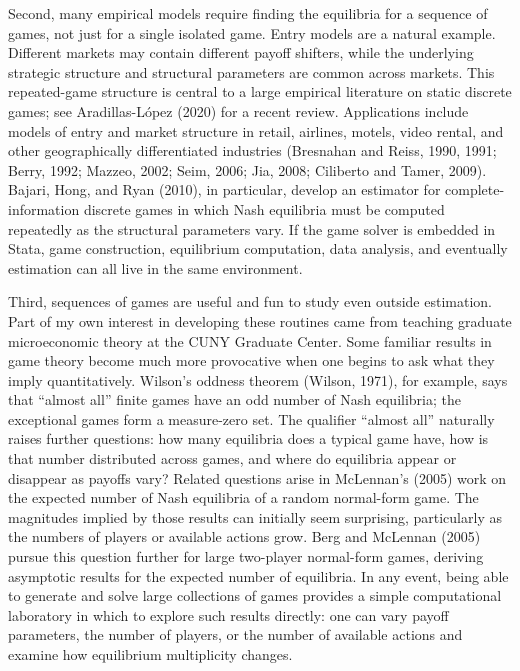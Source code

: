 \documentclass[11pt]{article}
\begin{document}
Second, many empirical models require finding the equilibria for a
sequence of games, not just for a single isolated game. Entry models are
a natural example. Different markets may contain different payoff
shifters, while the underlying strategic structure and structural
parameters are common across markets. This repeated-game structure is
central to a large empirical literature on static discrete games; see
Aradillas-López (2020) for a recent review. Applications include models
of entry and market structure in retail, airlines, motels, video rental,
and other geographically differentiated industries (Bresnahan and Reiss,
1990, 1991; Berry, 1992; Mazzeo, 2002; Seim, 2006; Jia, 2008; Ciliberto
and Tamer, 2009). Bajari, Hong, and Ryan (2010), in particular, develop
an estimator for complete-information discrete games in which Nash
equilibria must be computed repeatedly as the structural parameters
vary. If the game solver is embedded in Stata, game construction,
equilibrium computation, data analysis, and eventually estimation can
all live in the same environment.

Third, sequences of games are useful and fun to study even outside
estimation. Part of my own interest in developing these routines came
from teaching graduate microeconomic theory at the CUNY Graduate Center.
Some familiar results in game theory become much more provocative when
one begins to ask what they imply quantitatively. Wilson's oddness
theorem (Wilson, 1971), for example, says that ``almost all'' finite
games have an odd number of Nash equilibria; the exceptional games form
a measure-zero set. The qualifier ``almost all'' naturally raises
further questions: how many equilibria does a typical game have, how is
that number distributed across games, and where do equilibria appear or
disappear as payoffs vary? Related questions arise in McLennan's (2005)
work on the expected number of Nash equilibria of a random normal-form
game. The magnitudes implied by those results can initially seem
surprising, particularly as the numbers of players or available actions
grow. Berg and McLennan (2005) pursue this question further for large
two-player normal-form games, deriving asymptotic results for the
expected number of equilibria. In any event, being able to generate and
solve large collections of games provides a simple computational
laboratory in which to explore such results directly: one can vary
payoff parameters, the number of players, or the number of available
actions and examine how equilibrium multiplicity changes.
\end{document}

